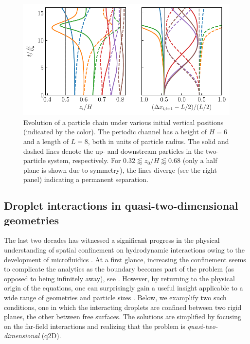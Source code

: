 \begin{figure}%
  \centering
  \includegraphics[width=0.9\columnwidth]{H3.pdf}
  \caption{Evolution of a particle chain under various initial vertical positions (indicated by the color). The periodic channel has a height of $H=6$ and a length of $L=8$, both in units of particle radius. The solid and dashed lines denote the up- and downstream particles in the two-particle system, respectively. For $0.32 \lessapprox z_0/H \lessapprox 0.68$ (only a half plane is shown due to symmetry), the lines diverge (see the right panel) indicating a permanent separation.}
  \label{fig:xover}
\end{figure}



\subsection{Droplet interactions in quasi-two-dimensional geometries}
\label{subsec:drop-confined}

The last two decades has witnessed a significant progress in the physical understanding of spatial confinement on hydrodynamic interactions owing to the development of microfluidics \citep{Cui_etal_2002, Cui2004, tlusty, Davit_2008, q2d_Beatus}. At a first glance, increasing the confinement seems to complicate the analytics as the boundary becomes part of the problem (as opposed to being infinitely away), see \eg \cite{LironMochon, Fouxon_Rubinstein2019}. However, by returning to the physical origin of the equations, one can surprisingly gain a useful insight applicable to a wide range of geometries and particle sizes \citep{Diamant_2005}. Below, we examplify two such conditions, one in which the interacting droplets are confined between two rigid planes, the other between free surfaces. The solutions are simplified by focusing on the far-field interactions and realizing that the problem is \emph{quasi-two-dimensional} (q2D). 

